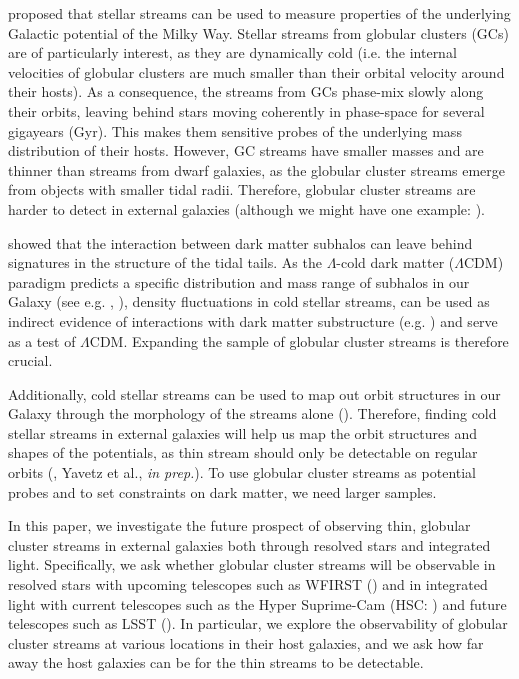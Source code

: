 \documentclass[twocolumn]{aastex62}
\begin{document}
\citet{johnston98} proposed that stellar streams can be used to measure properties of the underlying Galactic potential of the Milky Way. Stellar streams from globular clusters (GCs) are of particularly interest, as they are dynamically cold (i.e. the internal velocities of globular clusters are much smaller than their orbital velocity around their hosts). As a consequence,  the streams from GCs phase-mix slowly along their orbits, leaving behind stars moving coherently in phase-space for several gigayears (Gyr). This makes them sensitive probes of the underlying mass distribution of their hosts. However, GC streams have smaller masses and are thinner than streams from dwarf galaxies, as the globular cluster streams emerge from objects with smaller tidal radii. Therefore, globular cluster streams are harder to detect in external galaxies (although we might have one example: \citealt{abraham18}). 

\citet{ibata02} showed that the interaction between dark matter subhalos can leave behind signatures in the structure of the tidal tails. As the $\Lambda$-cold dark matter ($\Lambda$CDM) paradigm predicts a specific distribution and mass range of subhalos in our Galaxy (see e.g. \citealt{bovy17}, \citealt{bonaca19}), density fluctuations in cold stellar streams, can be used as indirect evidence of interactions with dark matter substructure (e.g. \citealt{yoon11}) and serve as a test of $\Lambda$CDM. Expanding the sample of globular cluster streams is therefore crucial. 

Additionally, cold stellar streams can be used to map out orbit structures in our Galaxy through the morphology of the streams alone (\citealt{pearson15}). Therefore, finding cold stellar streams in external galaxies will help us map the orbit structures and shapes of the potentials, as  thin stream should only be detectable on regular orbits (\citealt{price16}, Yavetz et al., {\it in prep.}).  To use globular cluster streams as potential probes and to set constraints on dark matter, we need larger samples. 


In this paper, we investigate the future prospect of observing thin, globular cluster streams in external galaxies both through resolved stars and integrated light. 
Specifically, we ask whether globular cluster streams will be observable in resolved stars with upcoming telescopes such as WFIRST (\citealt{spergel13}) and in integrated light with current telescopes such as the Hyper Suprime-Cam (HSC: \citealt{miyazaki12}) and future telescopes such as LSST (\citealt{ivezi08}). In particular, we explore the observability of globular cluster streams at various locations in their host galaxies, and we ask how far away the host galaxies can be for the thin streams to be detectable.
\end{document}
